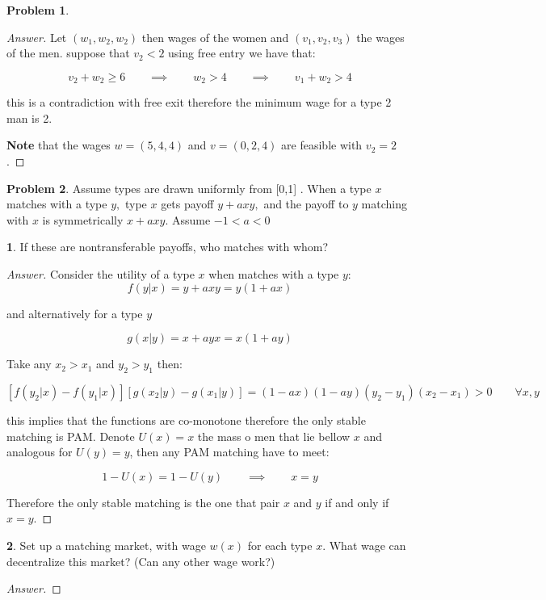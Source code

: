 \documentclass{article}
\theoremstyle{definition}
\newtheorem{problem}{Problem}
\newtheorem{subproblem}{}[problem]
\newcommand{\qiq}{\qquad \implies \qquad}
\begin{document}
\begin{problem}
\begin{proof}[Answer]
Let $(w_1,w_2,w_2)$ then wages of the women and $(v_1, v_2, v_3)$ the wages of the men. suppose that $v_2<2$ using free entry we have that:

$$v_2 + w_2 \geq 6 \qiq w_2 > 4 \qiq v_1 + w_2 > 4$$

this is a contradiction with free exit therefore the minimum wage for a type 2 man is 2.

\textbf{Note} that the wages $w=(5,4,4)$ and $v=(0,2,4)$ are feasible with $v_2=2$.

\end{proof}

\end{problem}

\begin{problem}
Assume types are drawn uniformly from [0,1] . When a type $x$ matches with a type $y,$ type $x$ gets payoff $y+a x y,$ and the payoff to $y$ matching with $x$ is symmetrically $x+a x y .$ Assume $-1<a<0$

\begin{subproblem}
    If these are nontransferable payoffs, who matches with whom?
\end{subproblem}


\begin{proof}[Answer]

Consider the utility of a type $x$ when matches with a type $y$:
$$f(y|x) = y+a x y = y(1+a x)$$

and alternatively for a type $y$

$$g(x|y) = x+a y x = x(1+a y)$$ 

Take any $x_2>x_1$ and $y_2>y_1$ then:

$$[f(y_2|x)-f(y_1|x)][g(x_2|y)-g(x_1|y)] = (1-ax)(1-ay)(y_2-y_1)(x_2-x_1)>0 \qquad \forall x,y$$

this implies that the functions are co-monotone therefore the only stable matching is PAM. Denote $U(x)=x$ the mass o men that lie bellow $x$ and analogous for $U(y)=y$, then any PAM matching have to meet:

$$1 - U(x) = 1 - U(y) \qiq x = y $$

Therefore the only stable matching is the one that pair $x$ and $y$ if and only if $x=y$.



\end{proof}



\begin{subproblem}
Set up a matching market, with wage $w(x)$ for each type $x$. What wage can decentralize this market? (Can any other wage work?)
\end{subproblem}
\begin{proof}[Answer]


\end{proof}
\end{problem}
\end{document}
